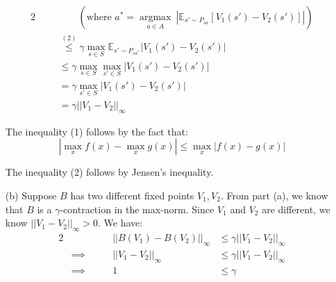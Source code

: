 \begin{solution}
\begin{itemize}
{\begin{alignat*}{2}
                           &                                                                                    &                            & \qquad \left(\text{where } a^* = \operatorname*{argmax}_{a \in A}\
                          \left| \mathbb{E}_{s' \sim P_{sa}}[V_1(s') - V_2(s')] \right| \right)                                                                                                                                           \\
                           &                                                                                    &                            & \overset{(2)}{\le} \gamma \max_{s \in S} \mathbb{E}_{s' \sim P_{sa^*}} |V_1(s') - V_2(s')| \\
                           &                                                                                    &                            & \le \gamma \max_{s \in S} \max_{s' \in S} |V_1(s') - V_2(s')|                              \\
                           &                                                                                    &                            & = \gamma \max_{s' \in S} |V_1(s') - V_2(s')|                                               \\
                           &                                                                                    &                            & = \gamma ||V_1 - V_2||_\infty
                      \end{alignat*}
                  }

              The inequality (1) follows by the fact that:
              $$
                  |\max_x f(x) - \max_x g(x)| \le \max_x |f(x) - g(x)|
              $$

              The inequality (2) follows by Jensen's inequality.
        \item[(b)]
              Suppose $B$ has two different fixed points $V_1, V_2$. From part (a), we know that $B$ is a $\gamma$-contraction in the max-norm. Since $V_1$ and $V_2$ are different, we know $||V_1 - V_2||_\infty > 0$. We have:
              \begin{alignat*}{2}
                   &                 & ||B(V_1) - B(V_2)||_\infty & \le \gamma ||V_1 - V_2||_\infty \\[1ex]
                   & \implies \qquad & ||V_1 - V_2||_\infty       & \le \gamma ||V_1 - V_2||_\infty \\[1ex]
                   & \implies \qquad & 1                          & \le \gamma
              \end{alignat*}


\end{itemize}
\end{solution}
